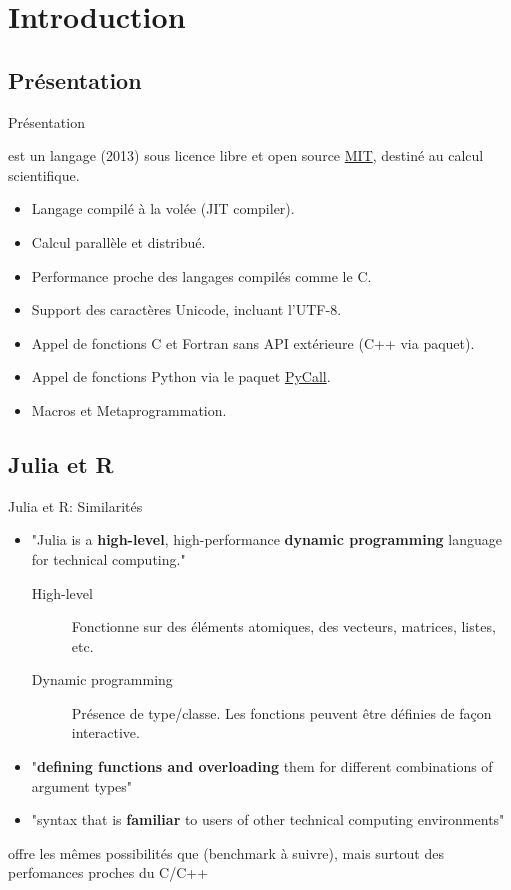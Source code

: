 \section{Introduction}
\subsection{Présentation}
\begin{frame}{Présentation}
    \par{{\Julia} est un langage (2013) sous licence libre et open source \href{https://github.com/JuliaLang/julia/blob/master/LICENSE.md}{MIT}, destiné au calcul scientifique.}
    \begin{itemize}
        \item Langage compilé à la volée (JIT compiler).
        \item Calcul parallèle et distribué.
        \item Performance proche des langages compilés comme le C.
        \item Support des caractères Unicode, incluant l'UTF-8.
        \item Appel de fonctions C et Fortran sans API extérieure (C++ via paquet).
        \item Appel de fonctions Python via le paquet \href{https://github.com/stevengj/PyCall.jl}{PyCall}.
        \item Macros et Metaprogrammation.
    \end{itemize}
\end{frame}

\subsection{Julia et R}
\begin{frame}{Julia et R: Similarités}
    \begin{itemize}
        \item "Julia is a \textbf{high-level}, high-performance \textbf{dynamic programming} language for technical computing."
            \begin{description}
                \item[High-level] Fonctionne sur des éléments atomiques, des vecteurs, matrices, listes, etc.
                \item[Dynamic programming] Présence de type/classe. Les fonctions peuvent être définies de façon interactive.
            \end{description}
        \item "\textbf{defining functions and overloading} them for different combinations of argument types"
        \item "syntax that is \textbf{familiar} to users of other technical computing environments"
    \end{itemize}
    \par{{\Julia} offre les mêmes possibilités que {\R} (benchmark à suivre), mais surtout des perfomances proches du C/C++}
\end{frame}

